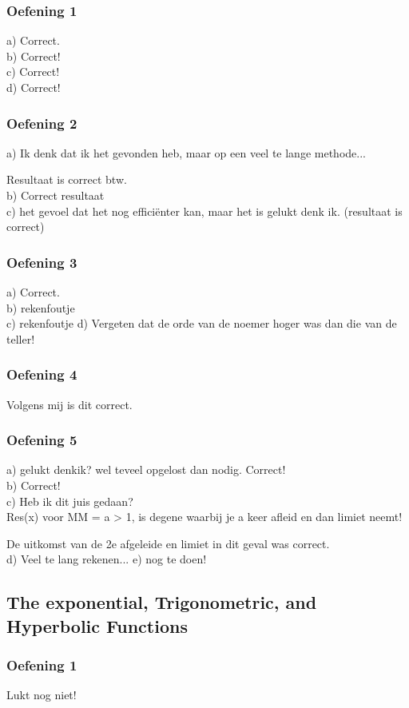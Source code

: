 \documentclass[a4paper,twoside]{article}
\theoremstyle{definition}
\theoremstyle{plain}
\begin{document}
\subsubsection{Oefening 1}
a) Correct.\\
b) Correct!\\
c) Correct!\\
d) Correct!
\subsubsection{Oefening 2}
a) Ik denk dat ik het gevonden heb, maar op een veel te lange methode...

Resultaat is correct btw.\\
b) Correct resultaat\\
c) het gevoel dat het nog efficiënter kan, maar het is gelukt denk ik. (resultaat is correct)
\subsubsection{Oefening 3}
a) Correct.\\
b) rekenfoutje\\
c) rekenfoutje %
d) Vergeten dat de orde van de noemer hoger was dan die van de teller!
\subsubsection{Oefening 4}
Volgens mij is dit correct.
\subsubsection{Oefening 5}
a) gelukt denkik? wel teveel opgelost dan nodig. Correct!\\
b) Correct!\\
c) Heb ik dit juis gedaan?\\
Res(x) voor MM = a > 1, is degene waarbij je a keer afleid en dan limiet neemt!

De uitkomst van de 2e afgeleide en limiet in dit geval was correct.\\
d) Veel te lang rekenen...
e) nog te doen!
\subsection{The exponential, Trigonometric, and Hyperbolic Functions}
\subsubsection{Oefening 1}
Lukt nog niet!
\end{document}
